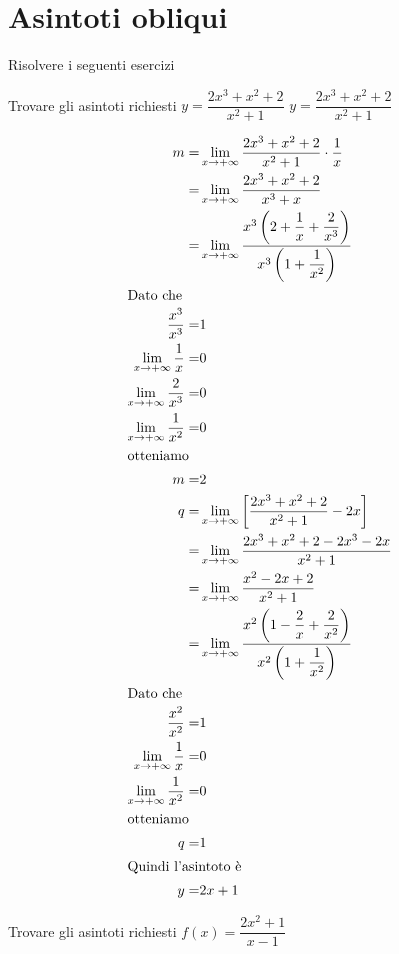 \section{Asintoti obliqui}
Risolvere i seguenti esercizi
\begin{exercise}
	Trovare gli asintoti richiesti
	$y=\dfrac{2x^3+x^2+2}{x^2+1}$
	\tcblower
	$y=\dfrac{2x^3+x^2+2}{x^2+1}$	
	
	\begin{align*}
	m=&\lim_{x\to +\infty}\dfrac{2x^3+x^2+2}{x^2+1}\cdot\dfrac{1}{x}\\
	=&\lim_{x\to +\infty}\dfrac{2x^3+x^2+2}{x^3+x}\\
	=&\lim_{x\to +\infty}\dfrac{x^3\left(2+\dfrac{1}{x}+\dfrac{2}{x^3}\right)}{x^3\left(1+\dfrac{1}{x^2}\right)}\\
	\intertext{Dato che}
	\dfrac{x^3}{x^3}=&1\\
	\lim_{x\to +\infty}\dfrac{1}{x}=&0\\
	\lim_{x\to +\infty}\dfrac{2}{x^3}=&0\\
	\lim_{x\to +\infty}\dfrac{1}{x^2}=&0\\
	\intertext{otteniamo}
	m=&2\\
	q=&\lim_{x\to +\infty}\left[\dfrac{2x^3+x^2+2}{x^2+1}-2x\right]\\
	=&\lim_{x\to +\infty}\dfrac{2x^3+x^2+2-2x^3-2x}{x^2+1}\\
	=&\lim_{x\to +\infty}\dfrac{x^2-2x+2}{x^2+1}\\
	=&\lim_{x\to +\infty}\dfrac{x^2\left(1-\dfrac{2}{x}+\dfrac{2}{x^2}\right)}{x^2\left(1+\dfrac{1}{x^2}\right)}\\
	\intertext{Dato che}
	\dfrac{x^2}{x^2}=&1\\
	\lim_{x\to +\infty}\dfrac{1}{x}=&0\\
	\lim_{x\to +\infty}\dfrac{1}{x^2}=&0\\
	\intertext{otteniamo}
	q=&1\\
	\intertext{Quindi l'asintoto è}
	y=&2x+1
	\end{align*}
\end{exercise}
\begin{exercise}[no solution]
	Trovare gli asintoti richiesti $f(x)= \dfrac{2x^2+1}{x-1}$
\end{exercise}

